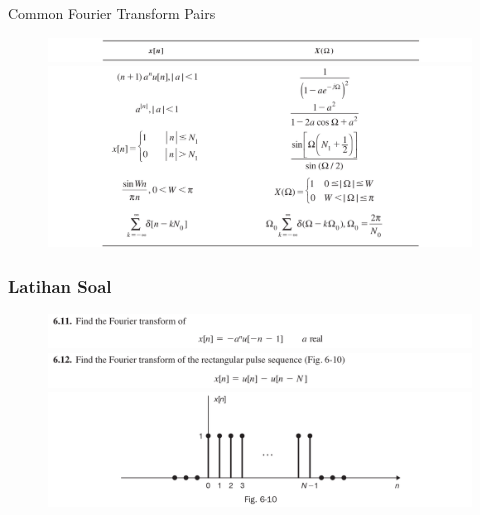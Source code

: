\documentclass[pdflatex,compress,mathserif]{beamer}
\begin{document}
\begin{frame}{Common Fourier Transform Pairs}
	\begin{figure}
		\centering
		\includegraphics[width=\linewidth]{img/img22}
		\includegraphics[width=\linewidth]{img/img23}
	\end{figure}
\end{frame}

\begin{frame}
	\frametitle{Latihan Soal}
	\begin{figure}
		\centering
		\includegraphics[width=\linewidth]{img/img24}
		\includegraphics[width=\linewidth]{img/img25}
		\includegraphics[width=\linewidth]{img/img26}
	\end{figure}
\end{frame}
\end{document}
